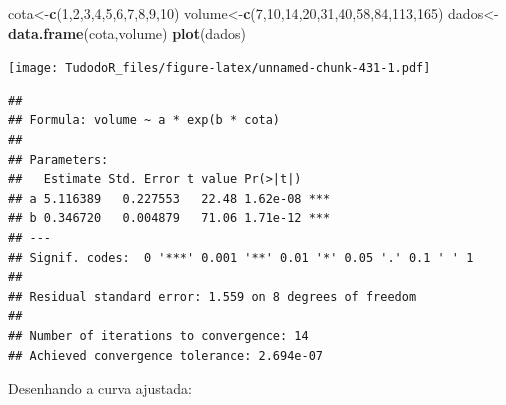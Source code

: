 \documentclass[
]{book}
\newenvironment{Shaded}{\begin{snugshade}}{\end{snugshade}}
\newcommand{\CommentTok}[1]{\textcolor[rgb]{0.56,0.35,0.01}{\textit{#1}}}
\newcommand{\DataTypeTok}[1]{\textcolor[rgb]{0.13,0.29,0.53}{#1}}
\newcommand{\DecValTok}[1]{\textcolor[rgb]{0.00,0.00,0.81}{#1}}
\newcommand{\KeywordTok}[1]{\textcolor[rgb]{0.13,0.29,0.53}{\textbf{#1}}}
\newcommand{\NormalTok}[1]{#1}
\newcommand{\OperatorTok}[1]{\textcolor[rgb]{0.81,0.36,0.00}{\textbf{#1}}}
\newcommand{\StringTok}[1]{\textcolor[rgb]{0.31,0.60,0.02}{#1}}
\begin{document}
\begin{Shaded}
\begin{Highlighting}[]
\NormalTok{cota<-}\KeywordTok{c}\NormalTok{(}\DecValTok{1}\NormalTok{,}\DecValTok{2}\NormalTok{,}\DecValTok{3}\NormalTok{,}\DecValTok{4}\NormalTok{,}\DecValTok{5}\NormalTok{,}\DecValTok{6}\NormalTok{,}\DecValTok{7}\NormalTok{,}\DecValTok{8}\NormalTok{,}\DecValTok{9}\NormalTok{,}\DecValTok{10}\NormalTok{) }
\NormalTok{volume<-}\KeywordTok{c}\NormalTok{(}\DecValTok{7}\NormalTok{,}\DecValTok{10}\NormalTok{,}\DecValTok{14}\NormalTok{,}\DecValTok{20}\NormalTok{,}\DecValTok{31}\NormalTok{,}\DecValTok{40}\NormalTok{,}\DecValTok{58}\NormalTok{,}\DecValTok{84}\NormalTok{,}\DecValTok{113}\NormalTok{,}\DecValTok{165}\NormalTok{) }
\NormalTok{dados<-}\KeywordTok{data.frame}\NormalTok{(cota,volume) }
\KeywordTok{plot}\NormalTok{(dados)}
\end{Highlighting}
\end{Shaded}

\texttt{[image: TudodoR\_files/figure-latex/unnamed-chunk-431-1.pdf]}

\begin{Shaded}
\end{Shaded}

\begin{verbatim}
## 
## Formula: volume ~ a * exp(b * cota)
## 
## Parameters:
##   Estimate Std. Error t value Pr(>|t|)    
## a 5.116389   0.227553   22.48 1.62e-08 ***
## b 0.346720   0.004879   71.06 1.71e-12 ***
## ---
## Signif. codes:  0 '***' 0.001 '**' 0.01 '*' 0.05 '.' 0.1 ' ' 1
## 
## Residual standard error: 1.559 on 8 degrees of freedom
## 
## Number of iterations to convergence: 14 
## Achieved convergence tolerance: 2.694e-07
\end{verbatim}

Desenhando a curva ajustada:
\end{document}
